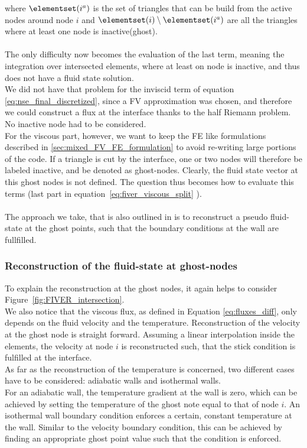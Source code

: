 \documentclass[../main.tex]{subfiles}
\begin{document}
where $\elementset(i^a)$ is the set of triangles that can be build from the active nodes around node $i$ and $\elementset(i)\setminus\elementset(i^a)$ are all the triangles where at least one node is inactive(ghost).\\
\\
The only difficulty now becomes the evaluation of the last term, meaning the integration over intersected elements, where at least on node is inactive, and thus does not have a fluid state solution.\\
We did not have that problem for the inviscid term of equation \eqref{eq:nse_final_discretized}, since a \ac{FV} approximation was chosen, and therefore we could construct a flux at the interface thanks to the half Riemann problem. No inactive node had to be considered.\\
For the viscous part, however, we want to keep the \ac{FE} like formulations described in \ref{sec:mixed_FV_FE_formulation} to avoid re-writing large portions of the code. If a triangle is cut by the interface, one or two nodes will therefore be labeled inactive, and be denoted as ghost-nodes.
Clearly, the fluid state vector at this ghost nodes is not defined. The question thus becomes how to evaluate this terms (last part in equation~\eqref{eq:fiver_viscous_split} ).\\
\\
The approach we take, that is also outlined in \cite{Farhat2014} is to reconstruct a pseudo fluid-state at the ghost points, such that the boundary conditions at the wall are fullfilled.

\subsubsection{Reconstruction of the fluid-state at ghost-nodes}\label{sec:ghost_node_reconstruction}

To explain the reconstruction at the ghost nodes, it again helps to consider Figure~\ref{fig:FIVER_intersection}.\\
We also notice that the viscous flux, as defined in Equation \ref{eq:fluxes_diff}, only depends on the fluid velocity and the temperature.
Reconstruction of the velocity at the ghost node is straight forward. Assuming a linear interpolation inside the elements, the velocity at node $i$ is reconstructed such, that the stick condition is fulfilled at the interface.\\
As far as the reconstruction of the temperature is concerned, two different cases have to be considered: adiabatic walls and isothermal walls.\\
For an adiabatic wall, the temperature gradient at the wall is zero, which can be achieved by setting the temperature of the ghost note equal to that of node $i$. An isothermal wall boundary condition enforces a certain, constant temperature at the wall. Similar to the velocity boundary condition, this can be achieved by finding an appropriate ghost point value such that the condition is enforced.\\
\end{document}
